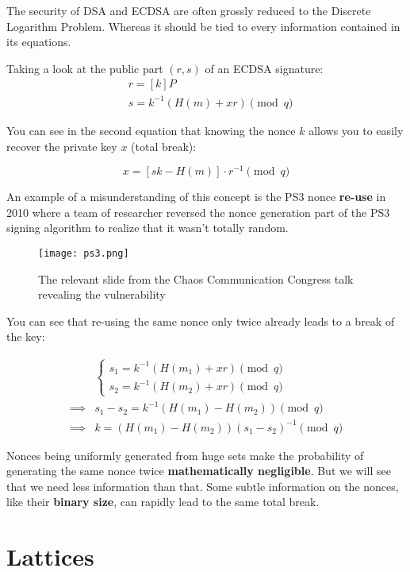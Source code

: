 \documentclass[a4paper,11pt]{article}
\begin{document}
The security of DSA and ECDSA are often grossly reduced to the Discrete Logarithm Problem. Whereas it should be tied to every information contained in its equations.

Taking a look at the public part $(r, s)$ of an ECDSA signature:
\begin{align*}
&r = [k] P\\
&s = k^{-1} ( H(m) + x r ) \pmod{q}
\end{align*}

You can see in the second equation that knowing the nonce $k$ allows you to easily recover the private key $x$ (total break):

$$
x = [ s k - H(m) ] \cdot r^{-1} \pmod{q}
$$

An example of a misunderstanding of this concept is the PS3 nonce \textbf{re-use} in 2010\cite{ps3} where a team of researcher reversed the nonce generation part of the PS3 signing algorithm to realize that it wasn't totally random.

\begin{figure}[H]
\texttt{[image: ps3.png]}
\caption{The relevant slide from the Chaos Communication Congress talk revealing the vulnerability}
\end{figure}

You can see that re-using the same nonce only twice already leads to a break of the key:

\begin{align*}
    &\begin{cases}
    s_1 = k^{-1} ( H(m_1) + x r ) \pmod{q}\\
    s_2 = k^{-1} ( H(m_2) + x r ) \pmod{q}
    \end{cases}\\
\implies& s_1 - s_2 = k^{-1} ( H(m_1) - H(m_2) ) \pmod{q}\\
\implies& k = (H(m_1) - H(m_2)) (s_1 - s_2)^{-1} \pmod{q}
\end{align*}

Nonces being uniformly generated from huge sets make the probability of generating the same nonce twice \textbf{mathematically negligible}. But we will see that we need less information than that. Some subtle information on the nonces, like their \textbf{binary size}, can rapidly lead to the same total break.

\section{Lattices}
\end{document}
